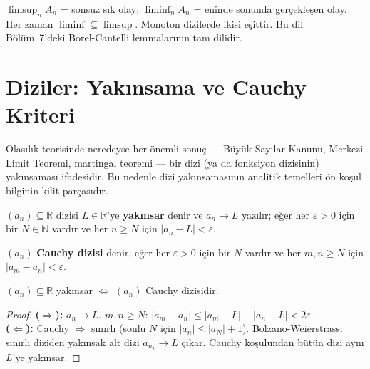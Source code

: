 \begin{mikroozet}[§0.5 özeti]
$\limsup_n A_n$ = sonsuz sık olay; $\liminf_n A_n$ = eninde sonunda
gerçekleşen olay. Her zaman $\liminf \subseteq \limsup$. Monoton dizilerde
ikisi eşittir. Bu dil Bölüm~7'deki Borel-Cantelli lemmalarının tam dilidir.
\end{mikroozet}


\section{Diziler: Yakınsama ve Cauchy Kriteri}
\label{sec:dizi_yaklinsama}

\begin{motivasyon}
Olasılık teorisinde neredeyse her önemli sonuç --- Büyük Sayılar Kanunu,
Merkezi Limit Teoremi, martingal teoremi --- bir dizi (ya da fonksiyon dizisinin)
yakınsaması ifadesidir. Bu nedenle dizi yakınsamasının analitik temelleri
ön koşul bilginin kilit parçasıdır.
\end{motivasyon}

\begin{tanim}
$(a_n) \subseteq \mathbb{R}$ dizisi $L \in \mathbb{R}$'ye \textbf{yakınsar} denir ve
$a_n \to L$ yazılır; eğer her $\varepsilon > 0$ için bir $N \in \mathbb{N}$ vardır
ve her $n \geq N$ için $|a_n - L| < \varepsilon$.
\end{tanim}

\begin{tanim}
$(a_n)$ \textbf{Cauchy dizisi} denir, eğer her $\varepsilon > 0$ için bir $N$ vardır
ve her $m, n \geq N$ için $|a_m - a_n| < \varepsilon$.
\end{tanim}

\begin{teorem}
\label{thm:gercel_tamlik}
$(a_n) \subseteq \mathbb{R}$ yakınsar $\Leftrightarrow$ $(a_n)$ Cauchy dizisidir.
\end{teorem}

\begin{proof}
\textbf{($\Rightarrow$):} $a_n \to L$. $m, n \geq N$: $|a_m - a_n| \leq |a_m - L| + |a_n - L| < 2\varepsilon$.\\
\textbf{($\Leftarrow$):} Cauchy $\Rightarrow$ sınırlı (sonlu $N$ için $|a_n| \leq |a_N| + 1$).
Bolzano-Weierstrass: sınırlı diziden yakınsak alt dizi $a_{n_k} \to L$ çıkar.
Cauchy koşulundan bütün dizi aynı $L$'ye yakınsar.
\end{proof}

